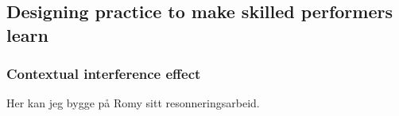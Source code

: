 




\subsection{Designing practice to make skilled performers learn}


\subsubsection{Contextual interference effect}
Her kan jeg bygge på Romy sitt resonneringsarbeid. 



